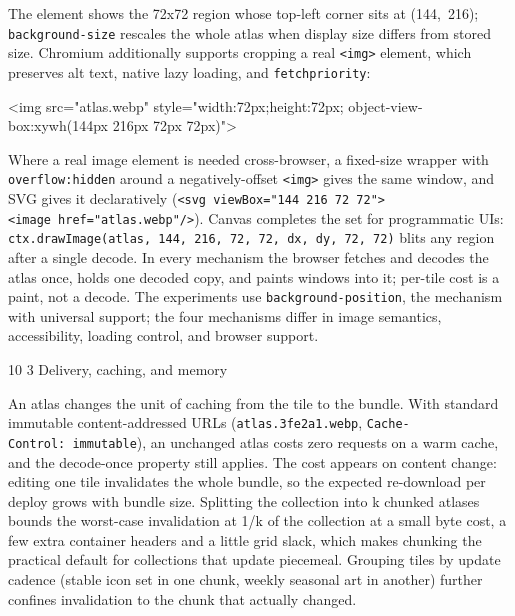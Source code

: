 \documentclass[3p,twocolumn]{elsarticle}
\makeatletter
\renewcommand\subsection{\@startsection{subsection}{2}{\z@}%
           {10\p@ \@plus 3\p@ \@minus 3\p@}%
           {3\p@ \@plus 2\p@ \@minus 1\p@}%
           {\normalfont\normalsize\itshape}}
\makeatother
\begin{document}
The element shows the 72x72 region whose top-left corner sits at
(144,~216); \texttt{background-size} rescales the whole atlas when
display size differs from stored size. Chromium additionally supports
cropping a real \texttt{\textless{}img\textgreater{}} element, which
preserves alt text, native lazy loading, and \texttt{fetchpriority}:

\begin{code}
<img src="atlas.webp" style="width:72px;height:72px;
     object-view-box:xywh(144px 216px 72px 72px)">
\end{code}

Where a real image element is needed cross-browser, a fixed-size wrapper
with \texttt{overflow:hidden} around a negatively-offset
\texttt{\textless{}img\textgreater{}} gives the same window, and SVG
gives it declaratively
(\texttt{\textless{}svg\ viewBox="144\ 216\ 72\ 72"\textgreater{}\textless{}image\ href="atlas.webp"/\textgreater{}}).
Canvas completes the set for programmatic UIs:
\texttt{ctx.drawImage(atlas,\ 144,\ 216,\ 72,\ 72,\ dx,\ dy,\ 72,\ 72)}
blits any region after a single decode. In every mechanism the browser
fetches and decodes the atlas once, holds one decoded copy, and paints
windows into it; per-tile cost is a paint, not a decode. The experiments
use \texttt{background-position}, the mechanism with universal support;
the four mechanisms differ in image semantics, accessibility, loading
control, and browser support.

\subsection{Delivery, caching, and
memory}

An atlas changes the unit of caching from the tile to the bundle. With
standard immutable content-addressed URLs (\texttt{atlas.3fe2a1.webp},
\texttt{Cache-Control:\ immutable}), an unchanged atlas costs zero
requests on a warm cache, and the decode-once property still applies.
The cost appears on content change: editing one tile invalidates the
whole bundle, so the expected re-download per deploy grows with bundle
size. Splitting the collection into k chunked atlases bounds the
worst-case invalidation at 1/k of the collection at a small byte cost, a
few extra container headers and a little grid slack, which makes
chunking the practical default for collections that update piecemeal.
Grouping tiles by update cadence (stable icon set in one chunk, weekly
seasonal art in another) further confines invalidation to the chunk that
actually changed.
\end{document}
